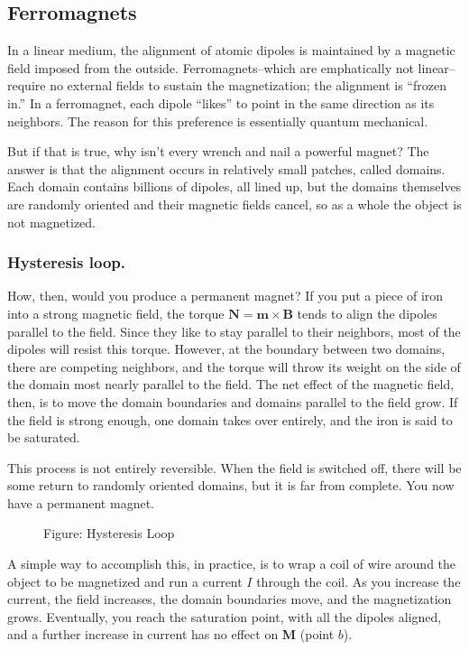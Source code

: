 \documentclass[../../../main.tex]{subfiles}
\begin{document}
\subsection*{Ferromagnets}
In a linear medium, the alignment of atomic dipoles is maintained by a magnetic ﬁeld imposed from the outside. Ferromagnets--which are emphatically not linear--require no external ﬁelds to sustain the magnetization; the alignment is “frozen in.” In a ferromagnet, each dipole “likes” to point in the same direction as its neighbors. The reason for this preference is essentially quantum mechanical. 

But if that is true, why isn’t every wrench and nail a powerful magnet? The answer is that the alignment occurs in relatively small patches, called domains. Each domain contains billions of dipoles, all lined up, but the domains themselves are randomly oriented and their magnetic ﬁelds cancel, so as a whole the object is not magnetized.

\subsubsection*{Hysteresis loop.} How, then, would you produce a permanent magnet? If you put a piece of iron into a strong magnetic ﬁeld, the torque $\mathbf{N} = \mathbf{m} \times \mathbf{B}$ tends to align the dipoles parallel to the ﬁeld. Since they like to stay parallel to their neighbors, most of the dipoles will resist this torque. However, at the boundary between two domains, there are competing neighbors, and the torque will throw its weight on the side of the domain most nearly parallel to the ﬁeld. The net effect of the magnetic ﬁeld, then, is to move the domain boundaries and domains parallel to the ﬁeld grow. If the ﬁeld is strong enough, one domain takes over entirely, and the iron is said to be saturated.

This process is not entirely reversible. When the ﬁeld is switched off, there will be some return to randomly oriented domains, but it is far from complete. You now have a permanent magnet.

\begin{figure*}
    \centering
    \caption*{Figure: Hysteresis Loop}
\end{figure*}

A simple way to accomplish this, in practice, is to wrap a coil of wire around the object to be magnetized and run a current $I$ through the coil. As you increase the current, the ﬁeld increases, the domain boundaries move, and the magnetization grows. Eventually, you reach the saturation point, with all the dipoles aligned, and a further increase in current has no effect on \textbf{M} (point $b$).
\end{document}

